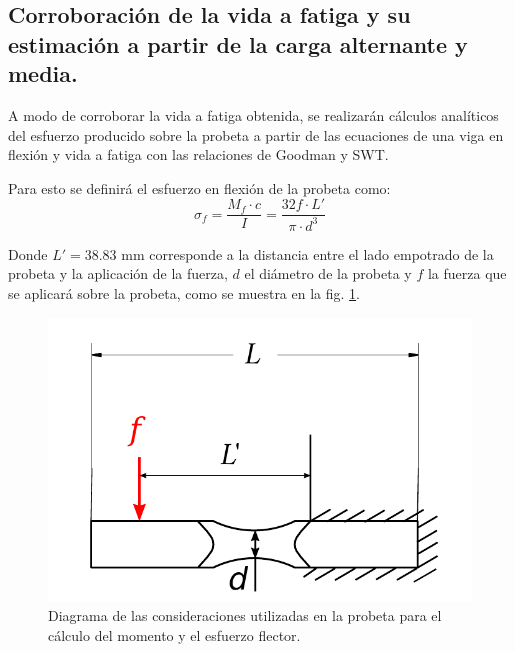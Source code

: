 
\subsection{Corroboración de la vida a fatiga y su estimación a partir de la carga alternante y media.}

A modo de corroborar la vida a fatiga obtenida, se realizarán cálculos analíticos del esfuerzo producido sobre la probeta a partir de las ecuaciones de una viga en flexión y vida a fatiga con las relaciones de Goodman y SWT.

Para esto se definirá el esfuerzo en flexión de la probeta como:
\begin{equation}
	\sigma_f = \frac{M_f \cdot c}{I} = \frac{32 f\cdot L'}{\pi \cdot d^3}
\end{equation}  

Donde $L' = 38.83$ mm corresponde a la distancia entre el lado empotrado de la probeta y la aplicación de la fuerza, $d$ el diámetro de la probeta y $f$ la fuerza que se aplicará sobre la probeta, como se muestra en la fig. \ref{fig:prob_vf}. 

\begin{figure}[h]
\centering
\includegraphics[width=0.8\linewidth, trim={-2cm -1cm -2cm 0cm}, clip]{Imagenes/probeta_carga.pdf}
\caption{Diagrama de las consideraciones utilizadas en la probeta para el cálculo del momento y el esfuerzo flector.}
\label{fig:prob_vf}
\end{figure}


